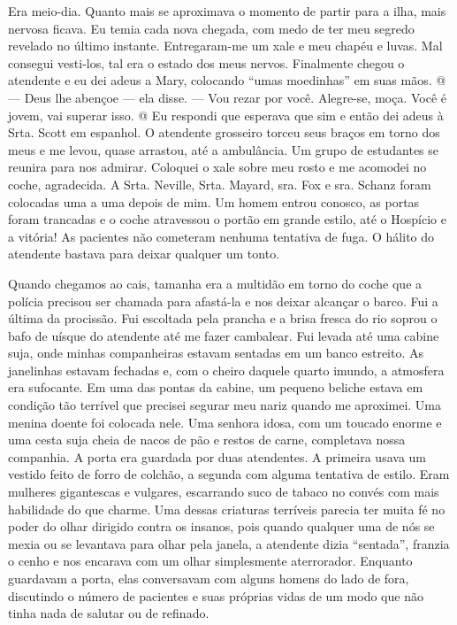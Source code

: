 Era meio-dia. Quanto mais se aproximava o momento de partir para a ilha,
mais nervosa ficava. Eu temia cada nova chegada, com medo de ter meu
segredo revelado no último instante. Entregaram-me um xale e meu chapéu
e luvas. Mal consegui vesti-los, tal era o estado dos meus nervos.
Finalmente chegou o atendente e eu dei adeus a Mary, colocando ``umas
moedinhas'' em suas mãos. @--- Deus lhe abençoe --- ela disse. --- Vou
rezar por você. Alegre-se, moça. Você é jovem, vai superar isso. @ Eu
respondi que esperava que sim e então dei adeus à Srta. Scott em
espanhol. O atendente grosseiro torceu seus braços em torno dos meus e
me levou, quase arrastou, até a ambulância. Um grupo de estudantes se
reunira para nos admirar. Coloquei o xale sobre meu rosto e me acomodei
no coche, agradecida. A Srta. Neville, Srta. Mayard, sra. Fox e sra.
Schanz foram colocadas uma a uma depois de mim. Um homem entrou conosco,
as portas foram trancadas e o coche atravessou o portão em grande
estilo, até o Hospício e a vitória! As pacientes não cometeram nenhuma
tentativa de fuga. O hálito do atendente bastava para deixar qualquer um
tonto.

Quando chegamos ao cais, tamanha era a multidão em torno do coche que a
polícia precisou ser chamada para afastá-la e nos deixar alcançar o
barco. Fui a última da procissão. Fui escoltada pela prancha e a brisa
fresca do rio soprou o bafo de uísque do atendente até me fazer
cambalear. Fui levada até uma cabine suja, onde minhas companheiras
estavam sentadas em um banco estreito. As janelinhas estavam fechadas e,
com o cheiro daquele quarto imundo, a atmosfera era sufocante. Em uma
das pontas da cabine, um pequeno beliche estava em condição tão terrível
que precisei segurar meu nariz quando me aproximei. Uma menina doente
foi colocada nele. Uma senhora idosa, com um toucado enorme e uma cesta
suja cheia de nacos de pão e restos de carne, completava nossa
companhia. A porta era guardada por duas atendentes. A primeira usava um
vestido feito de forro de colchão, a segunda com alguma tentativa de
estilo. Eram mulheres gigantescas e vulgares, escarrando suco de tabaco
no convés com mais habilidade do que charme. Uma dessas criaturas
terríveis parecia ter muita fé no poder do olhar dirigido contra os
insanos, pois quando qualquer uma de nós se mexia ou se levantava para
olhar pela janela, a atendente dizia ``sentada'', franzia o cenho e nos
encarava com um olhar simplesmente aterrorador. Enquanto guardavam a
porta, elas conversavam com alguns homens do lado de fora, discutindo o
número de pacientes e suas próprias vidas de um modo que não tinha nada
de salutar ou de refinado.

